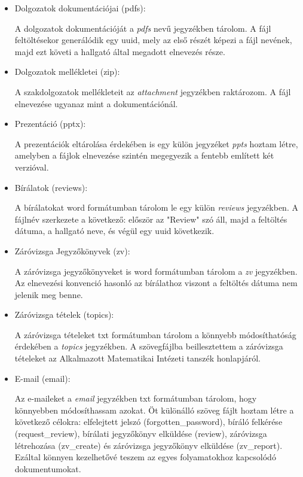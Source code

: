 \begin{itemize}

\item{Dolgozatok dokumentációjai (pdfs):}

A dolgozatok dokumentációját a \textit{pdfs} nevű jegyzékben tárolom. 
A fájl feltöltésekor generálódik egy uuid, mely az első részét képezi a fájl nevének, majd ezt követi a hallgató által megadott elnevezés része.

\item{Dolgozatok mellékletei (zip):}

A szakdolgozatok mellékleteit az \textit{attachment} jegyzékben raktározom. A fájl elnevezése ugyanaz mint a dokumentációnál.

\item{Prezentáció (pptx):}

A prezentációk eltárolása érdekében is egy külön jegyzéket \textit{ppts} hoztam létre, amelyben a fájlok elnevezése szintén megegyezik a fentebb említett két verzióval.

\item{Bírálatok (reviews):}

A bírálatokat word formátumban tárolom le egy külön \textit{reviews} jegyzékben. A fájlnév szerkezete a következő: először az "Review" szó áll, majd a feltöltés dátuma, a hallgató neve, és végül egy uuid következik.


\item{Záróvizsga Jegyzőkönyvek (zv):}

A záróvizsga jegyzőkönyveket is word formátumban tárolom a \textit{zv} jegyzékben. Az elnevezési konvenció hasonló az bírálathoz viszont a feltöltés dátuma nem jelenik meg benne.

\item{Záróvizsga tételek (topics):}

A záróvizsga tételeket txt formátumban tárolom a könnyebb módosíthatóság érdekében a \textit{topics} jegyzékben. A szövegfájlba beillesztettem a záróvizsga tételeket az Alkalmazott Matematikai Intézeti tanszék honlapjáról. 


\item{E-mail (email):}

Az e-maileket a \textit{email} jegyzékben txt formátumban tárolom, hogy könnyebben módosíthassam azokat. Öt különálló szöveg fájlt hoztam létre a következő célokra: elfelejtett jelszó (forgotten\_password), bíráló felkérése (request\_review), bírálati jegyzőkönyv elküldése (review), záróvizsga létrehozása (zv\_create) és záróvizsga jegyzőkönyv elküldése (zv\_report). Ezáltal könnyen kezelhetővé teszem az egyes folyamatokhoz kapcsolódó dokumentumokat.

\end{itemize}

